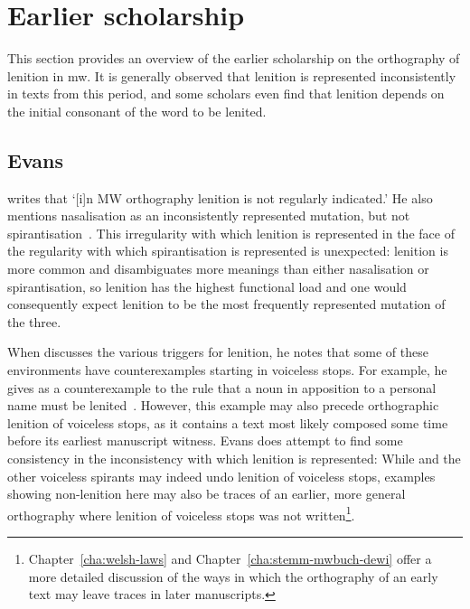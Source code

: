 \section{Earlier scholarship}
\label{sec:earlier-literature}
This section provides an overview of the earlier scholarship on the orthography of lenition in \gls{mw}. It is generally observed that lenition is represented inconsistently in texts from this period, and some scholars even find that lenition depends on the initial consonant of the word to be lenited.

\subsection{Evans}
\label{sec:evans}

\Textcite[§~18]{evans_grammar_1964} writes that `[i]n MW orthography lenition is not regularly indicated.' He also mentions nasalisation as an inconsistently represented mutation, but not spirantisation~\autocite[§§~24--25]{evans_grammar_1964}. This irregularity with which lenition is represented in the face of the regularity with which spirantisation is represented is unexpected:  lenition is  more common and  disambiguates more meanings than either nasalisation or spirantisation, so lenition has the highest functional load and one would consequently expect lenition to be the most frequently represented mutation of the three.

When \textcite{evans_grammar_1964} discusses the various triggers for lenition, he notes that some of these environments have counterexamples starting in voiceless stops. For example, he gives   as a counterexample to the rule that a noun in apposition to a personal name must be lenited~\autocite[§~19]{evans_grammar_1964}. However, this example may also precede orthographic lenition of voiceless stops, as it contains a text most likely composed some time before its earliest manuscript witness. Evans does attempt to find some consistency in the inconsistency with which lenition is represented:
While  and the other voiceless spirants may indeed undo lenition of voiceless stops, examples showing non-lenition here may also be traces of an earlier, more general orthography where lenition of voiceless stops was not written\footnote{Chapter~\ref{cha:welsh-laws} and Chapter~\ref{cha:stemm-mwbuch-dewi} offer a more detailed discussion of the ways in which the orthography of an early text may leave traces in later manuscripts.}.

